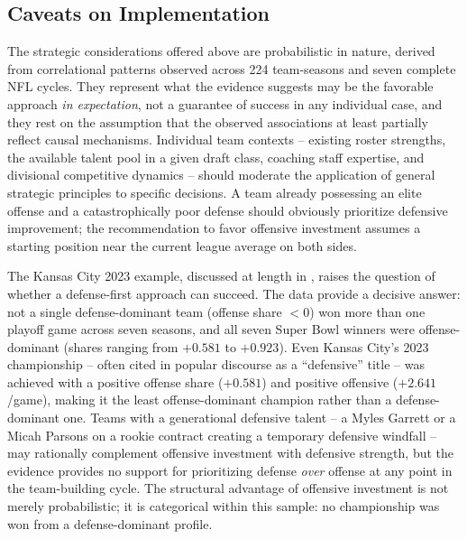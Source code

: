 \subsection{Caveats on Implementation}
\label{sec:implementation-caveats}

The strategic considerations offered above are probabilistic in nature,
derived from correlational patterns observed across 224 team-seasons and seven
complete NFL cycles. They represent what the evidence suggests may be the
favorable approach \emph{in expectation}, not a guarantee of success in any
individual case, and they rest on the assumption that the observed associations
at least partially reflect causal mechanisms. Individual team contexts -- existing
roster strengths, the available talent pool in a given draft class, coaching
staff expertise, and divisional competitive dynamics -- should moderate the
application of general strategic principles to specific decisions. A team
already possessing an elite offense and a catastrophically poor defense should
obviously prioritize defensive improvement; the recommendation to favor
offensive investment assumes a starting position near the current league average
on both sides.

The Kansas City 2023 example, discussed at length in
, raises the question of whether a
defense-first approach can succeed. The data provide a decisive answer: not a
single defense-dominant team (offense share $< 0$) won more than one playoff
game across seven seasons, and all seven Super Bowl winners were
offense-dominant (shares ranging from $+0.581$ to $+0.923$). Even Kansas City's
2023 championship -- often cited in popular discourse as a ``defensive''
title -- was achieved with a positive offense share ($+0.581$) and positive
offensive \xvoa{} ($+2.641$/game), making it the least offense-dominant
champion rather than a defense-dominant one. Teams with a generational
defensive talent -- a Myles Garrett or a Micah Parsons on a rookie
contract creating a temporary defensive windfall -- may rationally complement
offensive investment with defensive strength, but the evidence provides no
support for prioritizing defense \emph{over} offense at any point in the
team-building cycle. The structural advantage of offensive investment is not
merely probabilistic; it is categorical within this sample: no championship was
won from a defense-dominant profile.
